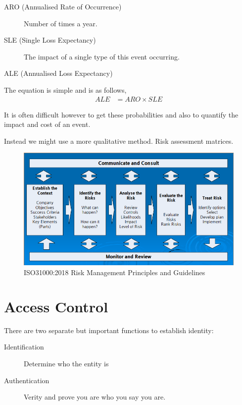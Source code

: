\documentclass{report}
\begin{document}
\begin{description}
    \item [ARO (Annualised Rate of Occurrence)] Number of times a year.

    \item [SLE (Single Loss Expectancy)]
        The impact of a single type of this event occurring.

    \item [ALE (Annualised Loss Expectancy)]
\end{description}

The equation is simple and is as follows,
\begin{align*}
    ALE &= ARO \times SLE
\end{align*}

It is often difficult however to get these probabilities and also to
quantify the impact and cost of an event.

Instead we might use a more qualitative method.
Risk assessment matrices.

\begin{figure}[h]
    \centering
    \includegraphics[width=\textwidth]{images/standards-flow.png}
    \caption{ISO31000:2018 Risk Management Principles and Guidelines}
\end{figure}

\chapter{Access Control}
There are two separate but important functions to establish identity:
\begin{description}
    \item [Identification] Determine who the entity is
    \item [Authentication] Verity and prove you are who you say you are.
\end{description}
\end{document}

